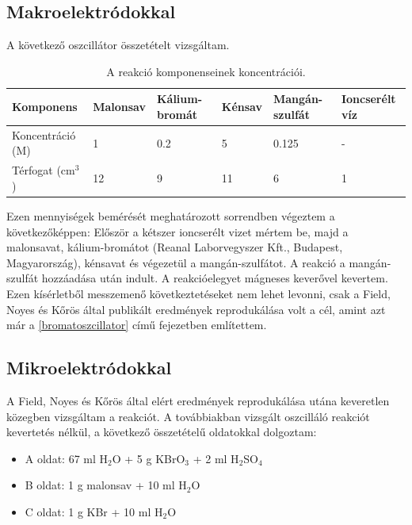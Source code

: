 \subsection{Makroelektródokkal}
A következő oszcillátor összetételt vizsgáltam.

\begin{table}[h!]
\centering
\caption{A reakció komponenseinek koncentrációi.}
\label{my-label}
\begin{tabular}{llllll}
Komponens                       & Malonsav & Kálium-bromát & Kénsav & Mangán-szulfát & Ioncserélt víz \\
\hline
Koncentráció (M)                & 1        & 0.2           & 5      & 0.125          & -              \\
Térfogat (cm$^3$) & 12       & 9             & 11     & 6              & 1              \\
\end{tabular}
\end{table}

Ezen mennyiségek bemérését meghatározott sorrendben végeztem a következőképpen: Először a kétszer ioncserélt vizet mértem be, majd a malonsavat, kálium-bromátot (Reanal Laborvegyszer Kft., Budapest, Magyarország), kénsavat és végezetül a mangán-szulfátot. A reakció a mangán-szulfát hozzáadása után indult. A reakcióelegyet mágneses keverővel kevertem. Ezen kísérletből messzemenő következtetéseket nem lehet levonni, csak a Field, Noyes és Kőrös által publikált eredmények reprodukálása \cite{noyes1972oscillations} volt a cél, amint azt már a \ref{bromatoszcillator} című fejezetben említettem.

\subsection{Mikroelektródokkal} \label{mikroelektrod}

A Field, Noyes és Kőrös által elért eredmények reprodukálása utána \cite{noyes1972oscillations} keveretlen közegben vizsgáltam a reakciót.
A továbbiakban vizsgált oszcilláló reakciót kevertetés nélkül, a következő összetételű oldatokkal dolgoztam: 

\begin{itemize} \label{komponensek}
\item A oldat: 67 ml H$_2$O + 5 g KBrO$_3$ + 2 ml H$_2$SO$_4$
\item B oldat: 1 g malonsav + 10 ml H$_2$O
\item C oldat: 1 g KBr + 10 ml H$_2$O
\end{itemize}

